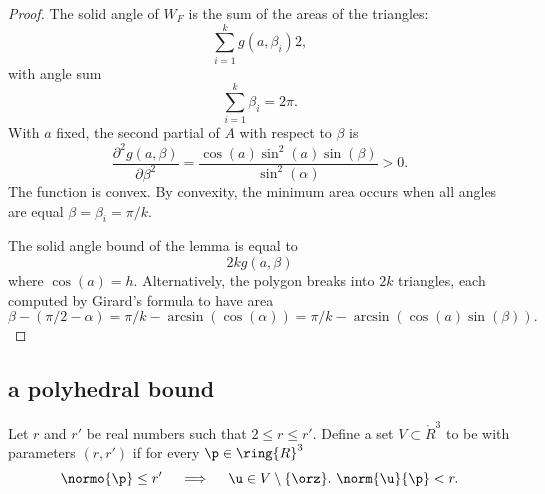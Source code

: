 \begin{proof}
The solid angle of $W_F$ is the sum of the areas of the triangles:
\begin{displaymath}
\sum_{i=1}^k g(a,\beta_i) 2,
\end{displaymath}
with angle sum
\begin{displaymath}
\sum_{i=1}^k \beta_i = 2\pi.
\end{displaymath}
With  $a$ fixed, the second partial of $A$ with respect to $\beta$ is
\begin{displaymath}
\frac{\partial^2 g(a,\beta)}{\partial \beta^2} = \frac{\cos(a)\sin^2(a)\sin(\beta)}{\sin^2(\alpha)} > 0.
\end{displaymath}
The function is convex.
By convexity, the minimum area occurs when all angles are equal
$\beta=\beta_i = \pi/k$.

The solid angle bound of the lemma is equal to 
\begin{displaymath}
2 k g(a,\beta)
\end{displaymath}
where $\cos(a)=h$.  Alternatively, the polygon breaks into $2k$
triangles, each computed by Girard's formula to have area
\begin{displaymath}
\beta - (\pi/2 - \alpha)  = \pi/k - \arcsin(\cos(\alpha)) = 
\pi/k - \arcsin(\cos(a)\sin(\beta)).
\end{displaymath}
\end{proof}




\subsection{a polyhedral bound}

\begin{definition}
Let $r$ and $r'$ be real numbers such that $2\le r\le r'$.  Define a
set $ V\subset\ring{R}^3$ to be  with
parameters $(r,r')$ if for every $\p\in\ring{R}^3$
\begin{displaymath}
\normo{\p}\le r'~~~\implies~~~  \u\in V\setminus\{\orz\}.~\norm{ \u}{\p}< r.
\end{displaymath}
\end{definition}

